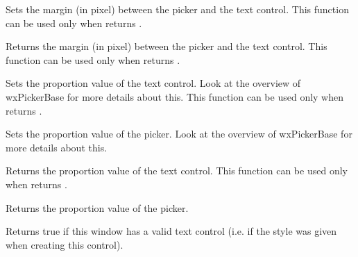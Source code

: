 Sets the margin (in pixel) between the picker and the text control.
This function can be used only when  returns \true.


\label{wxpickerbasegetinternalmargin}


Returns the margin (in pixel) between the picker and the text control.
This function can be used only when  returns \true.


\label{wxpickerbasesettextctrlproportion}


Sets the proportion value of the text control.
Look at the overview of wxPickerBase for more details about this.
This function can be used only when  returns \true.


\label{wxpickerbasesetpickerctrlproportion}


Sets the proportion value of the picker.
Look at the overview of wxPickerBase for more details about this.


\label{wxpickerbasegettextctrlproportion}


Returns the proportion value of the text control.
This function can be used only when  returns \true.


\label{wxpickerbasegetpickerctrlproportion}


Returns the proportion value of the picker.


\label{wxpickerbasehastextctrl}


Returns true if this window has a valid text control (i.e. if the  style was
given when creating this control).


\label{wxpickerbasegetextctrl}

